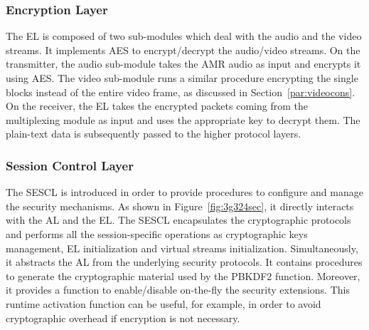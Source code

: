 \documentclass[10pt, conference, compsocconf]{IEEEtran}
\begin{document}

\subsubsection{Encryption Layer}
\label{EL}
The EL is composed of two sub-modules which deal with the audio and the video streams. It implements AES to encrypt/decrypt the audio/video streams. On the transmitter, the audio sub-module takes the AMR audio as input and encrypts it using AES. The video sub-module runs a similar procedure encrypting the single blocks instead of the entire video frame, as discussed in Section~\ref{par:videocons}. On the receiver, the EL takes the encrypted packets coming from the multiplexing module as input and uses the appropriate key to decrypt them. The plain-text data is subsequently passed to the higher protocol layers.
\\

\subsubsection{Session Control Layer}
The SESCL is introduced in order to provide procedures to configure and manage the security mechanisms. As shown in Figure~\ref{fig:3g324sec}, it directly interacts with the AL and the EL.
The SESCL encapsulates the cryptographic protocols and performs all the session-specific operations as cryptographic keys management, EL initialization and virtual streams initialization. Simultaneously, it abstracts the AL from the underlying security protocols.
It contains procedures to generate the cryptographic material used by the PBKDF2 function. Moreover, it provides a function to enable/disable on-the-fly the security extensions. This runtime activation function can be useful, for example, in order to avoid cryptographic overhead if encryption is not necessary.
\\
\end{document}
